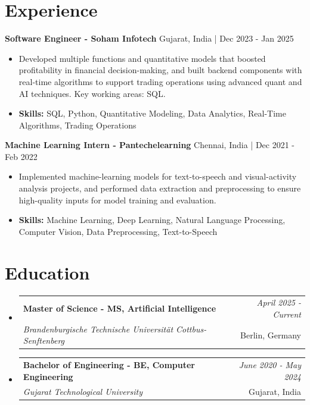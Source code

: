 \documentclass[a4paper,11pt]{article}
\makeatletter
\newcommand{\resumeSubheading}[4]{
\vspace{0.5mm}\item
    \begin{tabular*}{\linewidth}[t]{l@{\extracolsep{\fill}}r}
        \textbf{#1} & \textit{\footnotesize{#4}} \\
        \textit{\footnotesize{#3}} &  \footnotesize{#2}\\
    \end{tabular*}
    \vspace{-2.4mm}
}
\makeatother
\begin{document}
\section{\textbf{Experience}}


\vspace{1mm}
  \textbf{Software Engineer - Soham Infotech} \hfill Gujarat, India | Dec 2023 - Jan 2025
\vspace{-1.5mm} %
\begin{itemize}
  \item Developed multiple functions and quantitative models that boosted profitability in financial decision-making, and built backend components with real-time algorithms to support trading operations using advanced quant and AI techniques. Key working areas: SQL.

\vspace{-2mm}
  \item \textbf{Skills:} SQL, Python, Quantitative Modeling, Data Analytics, Real-Time Algorithms, Trading Operations
\end{itemize}

\vspace{1mm}
  \textbf{Machine Learning Intern - Pantechelearning} \hfill Chennai, India | Dec 2021 - Feb 2022
\vspace{-1.5mm} %
\begin{itemize}
  \item Implemented machine-learning models for text-to-speech and visual-activity analysis projects, and performed data extraction and preprocessing to ensure high-quality inputs for model training and evaluation.
\vspace{-2mm}
  \item \textbf{Skills:} Machine Learning, Deep Learning, Natural Language Processing, Computer Vision, Data Preprocessing, Text-to-Speech
\end{itemize}\section{\textbf{Education}}
\vspace{-0.4mm}

\begin{itemize}[leftmargin=0.15in, label={}]
\resumeSubheading
{Master of Science - MS, Artificial Intelligence }{Berlin, Germany}
{Brandenburgische Technische Universität Cottbus-Senftenberg  }{April 2025 - Current}

\vspace{1.0mm} %
\resumeSubheading
{Bachelor of Engineering - BE, Computer Engineering  }{Gujarat, India}
{Gujarat Technological University }{June 2020 - May 2024}

\end{itemize}
\end{document}
